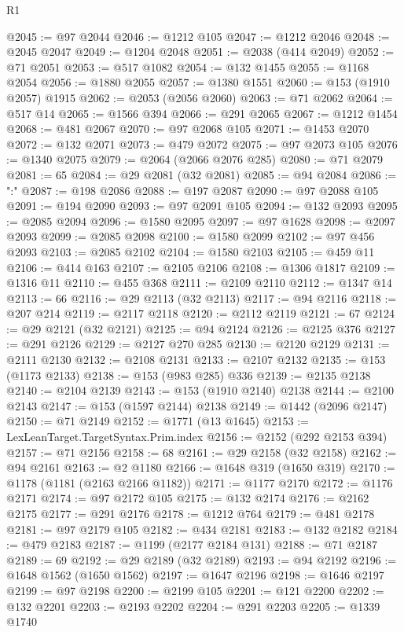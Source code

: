 \begin{lexlean}{R1}
\begin{coremodule}
{{{{{{{{{{{{{{{{{{{{{{{{{{{{{{{{{{{{{{{{{{{{{{{{{{{{{{{{{{{{{{{{{{{{{{{{{{{{{{{{{{{{{{{{{{{{{{{{{{{{{{{{{{{{{{{{{{{{{{{{{{{{{{{{{{{{{{{{{{{{{{{{{{{{{{{{{{{{{{{{{{{{{{{{{{{{{{{{{{{{{{{{{{@2045 := @97 @2044
@2046 := @1212 @105
@2047 := @1212 @2046
@2048 := @2045 @2047
@2049 := @1204 @2048
@2051 := @2038 (@414 @2049)
@2052 := @71 @2051
@2053 := @517 @1082
@2054 := @132 @1455
@2055 := @1168 @2054
@2056 := @1880 @2055
@2057 := @1380 @1551
@2060 := @153 (@1910 @2057) @1915
@2062 := @2053 (@2056 @2060)
@2063 := @71 @2062
@2064 := @517 @14
@2065 := @1566 @394
@2066 := @291 @2065
@2067 := @1212 @1454
@2068 := @481 @2067
@2070 := @97 @2068 @105
@2071 := @1453 @2070
@2072 := @132 @2071
@2073 := @479 @2072
@2075 := @97 @2073 @105
@2076 := @1340 @2075
@2079 := @2064 (@2066 @2076 @285)
@2080 := @71 @2079
@2081 := 65
@2084 := @29 @2081 (@32 @2081)
@2085 := @94 @2084
@2086 := ":"
@2087 := @198 @2086
@2088 := @197 @2087
@2090 := @97 @2088 @105
@2091 := @194 @2090
@2093 := @97 @2091 @105
@2094 := @132 @2093
@2095 := @2085 @2094
@2096 := @1580 @2095
@2097 := @97 @1628
@2098 := @2097 @2093
@2099 := @2085 @2098
@2100 := @1580 @2099
@2102 := @97 @456 @2093
@2103 := @2085 @2102
@2104 := @1580 @2103
@2105 := @459 @11
@2106 := @414 @163
@2107 := @2105 @2106
@2108 := @1306 @1817
@2109 := @1316 @11
@2110 := @455 @368
@2111 := @2109 @2110
@2112 := @1347 @14
@2113 := 66
@2116 := @29 @2113 (@32 @2113)
@2117 := @94 @2116
@2118 := @207 @214
@2119 := @2117 @2118
@2120 := @2112 @2119
@2121 := 67
@2124 := @29 @2121 (@32 @2121)
@2125 := @94 @2124
@2126 := @2125 @376
@2127 := @291 @2126
@2129 := @2127 @270 @285
@2130 := @2120 @2129
@2131 := @2111 @2130
@2132 := @2108 @2131
@2133 := @2107 @2132
@2135 := @153 (@1173 @2133)
@2138 := @153 (@983 @285) @336
@2139 := @2135 @2138
@2140 := @2104 @2139
@2143 := @153 (@1910 @2140) @2138
@2144 := @2100 @2143
@2147 := @153 (@1597 @2144) @2138
@2149 := @1442 (@2096 @2147)
@2150 := @71 @2149
@2152 := @1771 (@13 @1645)
@2153 := LexLeanTarget.TargetSyntax.Prim.index
@2156 := @2152 (@292 @2153 @394)
@2157 := @71 @2156
@2158 := 68
@2161 := @29 @2158 (@32 @2158)
@2162 := @94 @2161
@2163 := @2 @1180
@2166 := @1648 @319 (@1650 @319)
@2170 := @1178 (@1181 (@2163 @2166 @1182))
@2171 := @1177 @2170
@2172 := @1176 @2171
@2174 := @97 @2172 @105
@2175 := @132 @2174
@2176 := @2162 @2175
@2177 := @291 @2176
@2178 := @1212 @764
@2179 := @481 @2178
@2181 := @97 @2179 @105
@2182 := @434 @2181
@2183 := @132 @2182
@2184 := @479 @2183
@2187 := @1199 (@2177 @2184 @131)
@2188 := @71 @2187
@2189 := 69
@2192 := @29 @2189 (@32 @2189)
@2193 := @94 @2192
@2196 := @1648 @1562 (@1650 @1562)
@2197 := @1647 @2196
@2198 := @1646 @2197
@2199 := @97 @2198
@2200 := @2199 @105
@2201 := @121 @2200
@2202 := @132 @2201
@2203 := @2193 @2202
@2204 := @291 @2203
@2205 := @1339 @1740
}}}}}}}}}}}}}}}}}}}}}}}}}}}}}}}}}}}}}}}}}}}}}}}}}}}}}}}}}}}}}}}}}}}}}}}}}}}}}}}}}}}}}}}}}}}}}}}}}}}}}}}}}}}}}}}}}}}}}}}}}}}}}}}}}}}}}}}}}}}}}}}}}}}}}}}}}}}}}}}}}}}}}}}}}}}}}}}}}}}}}}}}}}
\end{coremodule}
\end{lexlean}
